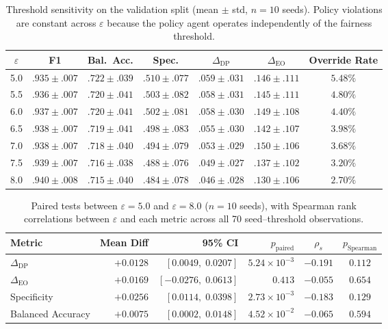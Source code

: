 \begin{table}[htbp]
\centering
\caption{Threshold sensitivity on the validation split (mean $\pm$ std,
$n{=}10$ seeds). Policy violations are constant across $\varepsilon$ because
the policy agent operates independently of the fairness threshold.}
\label{tab:sweep}
\setlength{\tabcolsep}{2.5pt}
\footnotesize
\begin{tabular}{ccccccc}
\hline
$\varepsilon$ & \textbf{F1} & \textbf{Bal.\ Acc.} & \textbf{Spec.} & \textbf{$\Delta_{\text{DP}}$} & \textbf{$\Delta_{\text{EO}}$} & \textbf{Override Rate} \\
\hline
5.0 & $.935 \pm .007$ & $.722 \pm .039$ & $.510 \pm .077$ & $.059 \pm .031$ & $.146 \pm .111$ & $5.48\%$ \\
5.5 & $.936 \pm .007$ & $.720 \pm .041$ & $.503 \pm .082$ & $.058 \pm .031$ & $.145 \pm .111$ & $4.80\%$ \\
6.0 & $.937 \pm .007$ & $.720 \pm .041$ & $.502 \pm .081$ & $.058 \pm .030$ & $.149 \pm .108$ & $4.40\%$ \\
6.5 & $.938 \pm .007$ & $.719 \pm .041$ & $.498 \pm .083$ & $.055 \pm .030$ & $.142 \pm .107$ & $3.98\%$ \\
7.0 & $.938 \pm .007$ & $.718 \pm .040$ & $.494 \pm .079$ & $.053 \pm .029$ & $.150 \pm .106$ & $3.68\%$ \\
7.5 & $.939 \pm .007$ & $.716 \pm .038$ & $.488 \pm .076$ & $.049 \pm .027$ & $.137 \pm .102$ & $3.20\%$ \\
8.0 & $.940 \pm .008$ & $.715 \pm .040$ & $.484 \pm .078$ & $.046 \pm .028$ & $.130 \pm .106$ & $2.70\%$ \\
\hline
\end{tabular}
\end{table}

\begin{table}[htbp]
\centering
\caption{Paired tests between $\varepsilon = 5.0$ and $\varepsilon = 8.0$
($n{=}10$ seeds), with Spearman rank correlations between $\varepsilon$ and
each metric across all 70 seed--threshold observations.}
\label{tab:trend}
\footnotesize
\begin{tabular}{lrrrcc}
\hline
\textbf{Metric} & \textbf{Mean Diff} & \textbf{95\% CI} & \textbf{$p_{\text{paired}}$} & \textbf{$\rho_s$} & \textbf{$p_{\text{Spearman}}$} \\
\hline
$\Delta_{\text{DP}}$  & $+0.0128$ & $[0.0049,\; 0.0207]$ & $5.24 \times 10^{-3}$ & $-0.191$ & $0.112$ \\
$\Delta_{\text{EO}}$  & $+0.0169$ & $[-0.0276,\; 0.0613]$ & $0.413$ & $-0.055$ & $0.654$ \\
Specificity           & $+0.0256$ & $[0.0114,\; 0.0398]$ & $2.73 \times 10^{-3}$ & $-0.183$ & $0.129$ \\
Balanced Accuracy     & $+0.0075$ & $[0.0002,\; 0.0148]$ & $4.52 \times 10^{-2}$ & $-0.065$ & $0.594$ \\
\hline
\end{tabular}
\end{table}

